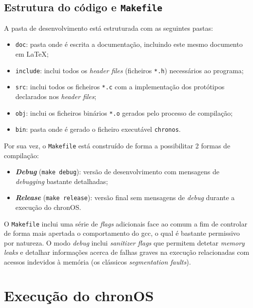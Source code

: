 \documentclass[10pt,oneside]{estiloUBI}
\newcommand{\chronOS}{\textsf{chronOS}}
\begin{document}
	
	\section{Estrutura do código e \texttt{Makefile}}
	\label{ssec:dev:struct_makefile}
	
	A pasta de desenvolvimento está estruturada com as seguintes pastas:
	
	\begin{itemize}
		\item \verb|doc|: pasta onde é escrita a documentação, incluindo este mesmo documento em \LaTeX;
		\item \verb|include|: inclui todos os \textit{header files} (ficheiros \verb|*.h|) necessários ao programa;
		\item \verb|src|: inclui todos os ficheiros \verb|*.c| com a implementação dos protótipos declarados nos \textit{header files};
		\item \verb|obj|: inclui os ficheiros binários \verb|*.o| gerados pelo processo de compilação;
		\item \verb|bin|: pasta onde é gerado o ficheiro executável \verb|chronos|.
	\end{itemize}

	Por sua vez, o \texttt{Makefile} está construído de forma a possibilitar 2 formas de compilação:
	
	\begin{itemize}
		\item \textbf{\textit{Debug}} (\verb|make debug|): versão de desenvolvimento com mensagens de \textit{debugging} bastante detalhadas;
		
		\item \textbf{\textit{Release}} (\verb|make release|): versão final sem mensagens de \textit{debug} durante a execução do \chronOS.
	\end{itemize}

	O \texttt{Makefile} inclui uma série de \textit{flags} adicionais face ao comum a fim de controlar de forma mais apertada o comportamento do \ac{gcc}, o qual é bastante permissivo por natureza. O modo \textit{debug} inclui \textit{sanitizer flags} que permitem detetar \textit{memory leaks} e detalhar informações acerca de falhas graves na execução relacionadas com acessos indevidos à memória (os clássicos \textit{segmentation faults}).
	
	
	\chapter{Execução do \chronOS}
	\label{sec:main}
	
\end{document}
